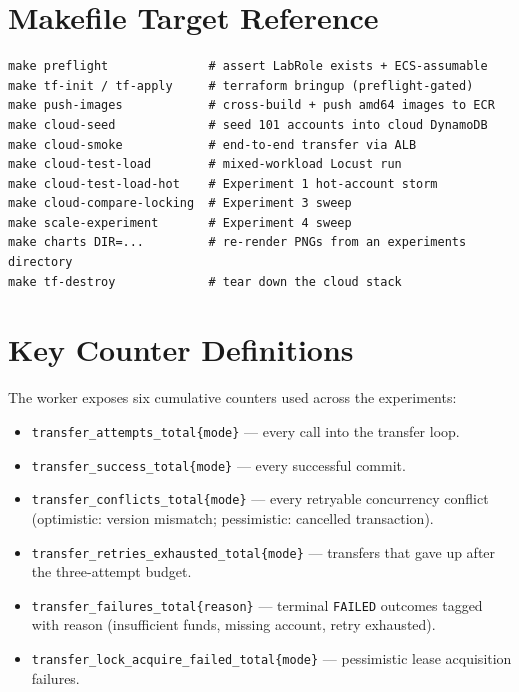 \documentclass[11pt,a4paper]{article}
\begin{document}
\section{Makefile Target Reference}

\begin{lstlisting}
make preflight              # assert LabRole exists + ECS-assumable
make tf-init / tf-apply     # terraform bringup (preflight-gated)
make push-images            # cross-build + push amd64 images to ECR
make cloud-seed             # seed 101 accounts into cloud DynamoDB
make cloud-smoke            # end-to-end transfer via ALB
make cloud-test-load        # mixed-workload Locust run
make cloud-test-load-hot    # Experiment 1 hot-account storm
make cloud-compare-locking  # Experiment 3 sweep
make scale-experiment       # Experiment 4 sweep
make charts DIR=...         # re-render PNGs from an experiments directory
make tf-destroy             # tear down the cloud stack
\end{lstlisting}

\section{Key Counter Definitions}

The worker exposes six cumulative counters used across the experiments:

\begin{itemize}[leftmargin=*, itemsep=0.2em]
    \item \texttt{transfer\_attempts\_total\{mode\}} --- every call into the transfer loop.
    \item \texttt{transfer\_success\_total\{mode\}} --- every successful commit.
    \item \texttt{transfer\_conflicts\_total\{mode\}} --- every retryable concurrency conflict (optimistic: version mismatch; pessimistic: cancelled transaction).
    \item \texttt{transfer\_retries\_exhausted\_total\{mode\}} --- transfers that gave up after the three-attempt budget.
    \item \texttt{transfer\_failures\_total\{reason\}} --- terminal \texttt{FAILED} outcomes tagged with reason (insufficient funds, missing account, retry exhausted).
    \item \texttt{transfer\_lock\_acquire\_failed\_total\{mode\}} --- pessimistic lease acquisition failures.
\end{itemize}
\end{document}
